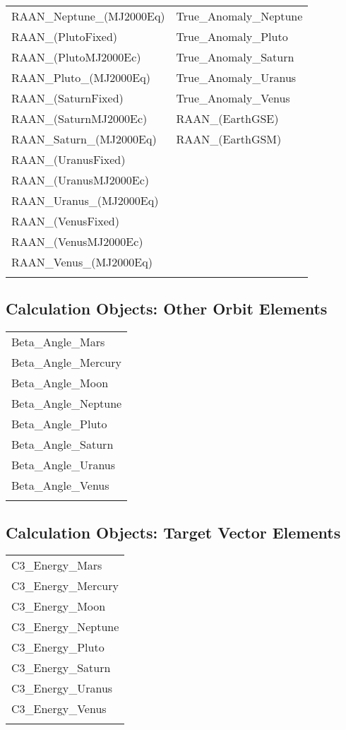 \begin{table}[ht!]
\begin{tabular}{ll}
    RAAN\_Neptune\_(MJ2000Eq) & True\_Anomaly\_Neptune\\
    RAAN\_(PlutoFixed) & True\_Anomaly\_Pluto\\
    RAAN\_(PlutoMJ2000Ec) & True\_Anomaly\_Saturn\\
    RAAN\_Pluto\_(MJ2000Eq) & True\_Anomaly\_Uranus\\
    RAAN\_(SaturnFixed) & True\_Anomaly\_Venus\\
    RAAN\_(SaturnMJ2000Ec) & RAAN\_(EarthGSE)\\
    RAAN\_Saturn\_(MJ2000Eq) & RAAN\_(EarthGSM)\\
    RAAN\_(UranusFixed) & \\
    RAAN\_(UranusMJ2000Ec) & \\
    RAAN\_Uranus\_(MJ2000Eq) & \\
    RAAN\_(VenusFixed) & \\
    RAAN\_(VenusMJ2000Ec) & \\
    RAAN\_Venus\_(MJ2000Eq) & \\
    \label{Table: AstroKepElems2}
\end{tabular}
\end{table}

\clearpage
\subsection{Calculation Objects: Other Orbit Elements}
\begin{table}[ht!]
\centering
    \begin{tabular}{l}
    Beta\_Angle\_Mars\\
    Beta\_Angle\_Mercury\\
    Beta\_Angle\_Moon\\
    Beta\_Angle\_Neptune\\
    Beta\_Angle\_Pluto\\
    Beta\_Angle\_Saturn\\
    Beta\_Angle\_Uranus\\
    Beta\_Angle\_Venus\\
    \label{Table: AstroOtherOrbit}
\end{tabular}
\end{table}

\subsection{Calculation Objects: Target Vector Elements}
\begin{table}[ht!]
\centering
    \begin{tabular}{l}
    C3\_Energy\_Mars\\
    C3\_Energy\_Mercury\\
    C3\_Energy\_Moon\\
    C3\_Energy\_Neptune\\
    C3\_Energy\_Pluto\\
    C3\_Energy\_Saturn\\
    C3\_Energy\_Uranus\\
    C3\_Energy\_Venus\\
    \label{Table: AstroTargetVector}
\end{tabular}
\end{table}

